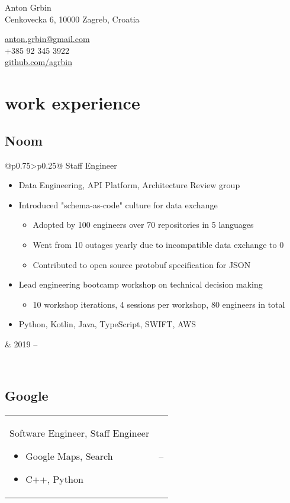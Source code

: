 \documentclass[a4paper]{article}
\makeatletter
\newlength{\tablewidth}
\newenvironment{period}[2]{%
\newcommand{\sarma}{#2}%
\setlength{\tablewidth}{\linewidth}
\addtolength{\tablewidth}{-2\tabcolsep}
\begin{tabular}{@{}p{0.75\tablewidth}>{\raggedleft\arraybackslash}p{0.25\tablewidth}@{}}%
#1 \newline
\begin{itemize}
}{%
\end{itemize} & \sarma \\%
\end{tabular}\\
}
\makeatother
\begin{document}
\fontfamily{\sfdefault}
\selectfont

\begin{minipage}{.5\textwidth}
\LARGE{Anton Grbin}\\
\normalsize{Cenkovecka 6, 10000 Zagreb, Croatia}
\end{minipage}%
\begin{minipage}{.5\textwidth}
\raggedleft
\href{mailto:anton.grbin@gmail.com}{anton.grbin@gmail.com} \\
+385 92 345 3922 \\
\href{https://github.com/agrbin}{github.com/agrbin}
\end{minipage}

\vspace{1em}

\section{work experience}

\subsection{Noom}
\begin{period}{Staff Engineer}{2019 --}
    \item Data Engineering, API Platform, Architecture Review group
    \item Introduced "schema-as-code" culture for data exchange
        \begin{itemize}
            \item Adopted by 100 engineers over 70 repositories in 5 languages
            \item Went from 10 outages yearly due to incompatible data exchange to 0
            \item Contributed to open source protobuf specification for JSON
        \end{itemize}
    \item Lead engineering bootcamp workshop on technical decision making
        \begin{itemize}
            \item 10 workshop iterations, 4 sessions per workshop, 80 engineers in total
        \end{itemize}
    \item Python, Kotlin, Java, TypeScript, SWIFT, AWS
\end{period}

\subsection{Google}
\begin{period}{Software Engineer, Staff Engineer}{2014 -- 2019}
    \item Google Maps, Search
    \item C++, Python
\end{period}
\end{document}
